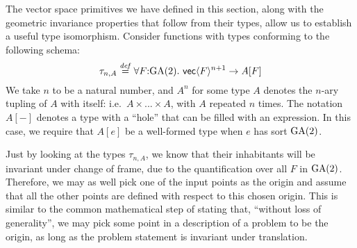 \begin{example}
  The vector space primitives we have defined in this section, along
  with the geometric invariance properties that follow from their
  types, allow us to establish a useful type isomorphism. Consider
  functions with types conforming to the following schema:
  \begin{displaymath}
    \tau_{n,A} \stackrel{\mathit{def}}= \forall F\mathord:\mathrm{GA}(2).\ \mathsf{vec}\langle F \rangle^{n+1} \to A[F]
  \end{displaymath}
  We take $n$ to be a natural number, and $A^n$ for some type $A$
  denotes the $n$-ary tupling of $A$ with itself: i.e.~$A \times
  ... \times A$, with $A$ repeated $n$ times. The notation $A[-]$
  denotes a type with a ``hole'' that can be filled with an
  expression. In this case, we require that $A[e]$ be a well-formed
  type when $e$ has sort $\mathrm{GA}(2)$.

  Just by looking at the types $\tau_{n,A}$, we know that their
  inhabitants will be invariant under change of frame, due to the
  quantification over all $F$ in $\mathrm{GA}(2)$. Therefore, we may as well
  pick one of the input points as the origin and assume that all the
  other points are defined with respect to this chosen origin. This is
  similar to the common mathematical step of stating that, ``without
  loss of generality'', we may pick some point in a description of a
  problem to be the origin, as long as the problem statement is
  invariant under translation.


\end{example}
